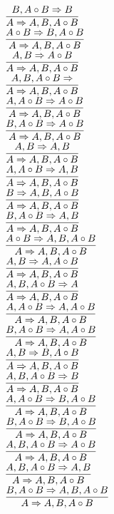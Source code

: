 \documentclass[11pt]{article}
\begin{document}
\begin{center}
\bigskip
\\$\infer{A\Rightarrow A, B, A\circ B}{B, A\circ B\Rightarrow B}$
\bigskip
\\$\infer{A\Rightarrow A, B, A\circ B}{A\circ B\Rightarrow B, A\circ B}$
\bigskip
\\$\infer{A\Rightarrow A, B, A\circ B}{A, B\Rightarrow A\circ B}$
\bigskip
\\$\infer{A\Rightarrow A, B, A\circ B}{A, B, A\circ B\Rightarrow }$
\bigskip
\\$\infer{A\Rightarrow A, B, A\circ B}{A, A\circ B\Rightarrow A\circ B}$
\bigskip
\\$\infer{A\Rightarrow A, B, A\circ B}{B, A\circ B\Rightarrow A\circ B}$
\bigskip
\\$\infer{A\Rightarrow A, B, A\circ B}{A, B\Rightarrow A, B}$
\bigskip
\\$\infer{A\Rightarrow A, B, A\circ B}{A, A\circ B\Rightarrow A, B}$
\bigskip
\\$\infer{A\Rightarrow A, B, A\circ B}{B\Rightarrow A, B, A\circ B}$
\bigskip
\\$\infer{A\Rightarrow A, B, A\circ B}{B, A\circ B\Rightarrow A, B}$
\bigskip
\\$\infer{A\Rightarrow A, B, A\circ B}{A\circ B\Rightarrow A, B, A\circ B}$
\bigskip
\\$\infer{A\Rightarrow A, B, A\circ B}{A, B\Rightarrow A, A\circ B}$
\bigskip
\\$\infer{A\Rightarrow A, B, A\circ B}{A, B, A\circ B\Rightarrow A}$
\bigskip
\\$\infer{A\Rightarrow A, B, A\circ B}{A, A\circ B\Rightarrow A, A\circ B}$
\bigskip
\\$\infer{A\Rightarrow A, B, A\circ B}{B, A\circ B\Rightarrow A, A\circ B}$
\bigskip
\\$\infer{A\Rightarrow A, B, A\circ B}{A, B\Rightarrow B, A\circ B}$
\bigskip
\\$\infer{A\Rightarrow A, B, A\circ B}{A, B, A\circ B\Rightarrow B}$
\bigskip
\\$\infer{A\Rightarrow A, B, A\circ B}{A, A\circ B\Rightarrow B, A\circ B}$
\bigskip
\\$\infer{A\Rightarrow A, B, A\circ B}{B, A\circ B\Rightarrow B, A\circ B}$
\bigskip
\\$\infer{A\Rightarrow A, B, A\circ B}{A, B, A\circ B\Rightarrow A\circ B}$
\bigskip
\\$\infer{A\Rightarrow A, B, A\circ B}{A, B, A\circ B\Rightarrow A, B}$
\bigskip
\\$\infer{A\Rightarrow A, B, A\circ B}{B, A\circ B\Rightarrow A, B, A\circ B}$

\end{center}
\end{document}
